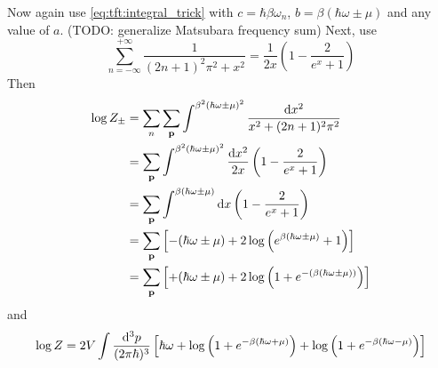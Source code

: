 Now again use \eqref{eq:tft:integral_trick} with $c = \hbar \beta \omega_n$, $b = \beta ( \hbar \omega \pm \mu )$ and any value of $a$.
(TODO: generalize Matsubara frequency sum)
Next, use
\begin{equation}
	\sum_{n=-\infty}^{+\infty} \frac{1}{(2n+1)^2\pi^2 + x^2} = \frac{1}{2x} \left( 1 - \frac{2}{e^x+1} \right)
\end{equation}
Then
\begin{equation}
\begin{split}
	\log Z_\pm & = \sum_n \sum_{\mathbf{p}} \int^{\beta^2 (\hbar \omega \pm \mu)^2} \frac{\mathop{}\!\mathrm{d} x^2}{x^2 + (2n+1)^2\pi^2} \\
	           & =        \sum_{\mathbf{p}} \int^{\beta^2 (\hbar \omega \pm \mu)^2} \frac{\mathop{}\!\mathrm{d} x^2}{2 x} \left( 1 - \frac{2}{e^x +1} \right) \\
	           & =        \sum_{\mathbf{p}} \int^{\beta   (\hbar \omega \pm \mu)  }       \mathop{}\!\mathrm{d} x         \left( 1 - \frac{2}{e^x +1} \right) \\
	           & =        \sum_{\mathbf{p}} \left[ -(\hbar \omega \pm \mu) + 2 \log \left( e^{\beta (\hbar \omega \pm \mu)} + 1 \right) \right]    \\
	           & =        \sum_{\mathbf{p}} \left[ +(\hbar \omega \pm \mu) + 2 \log \left( 1 + e^{-(\beta (\hbar \omega \pm \mu))} \right) \right] \\
\end{split}
\end{equation}
and
\begin{equation}
	\log Z %
	       = 2 V \int \frac{\dif^3 p}{(2 \pi \hbar)^3} \left[ \hbar \omega + \log \left( 1 + e^{-\beta (\hbar \omega + \mu)} \right) + \log \left( 1 + e^{-\beta (\hbar \omega - \mu)} \right) \right]
\end{equation}
